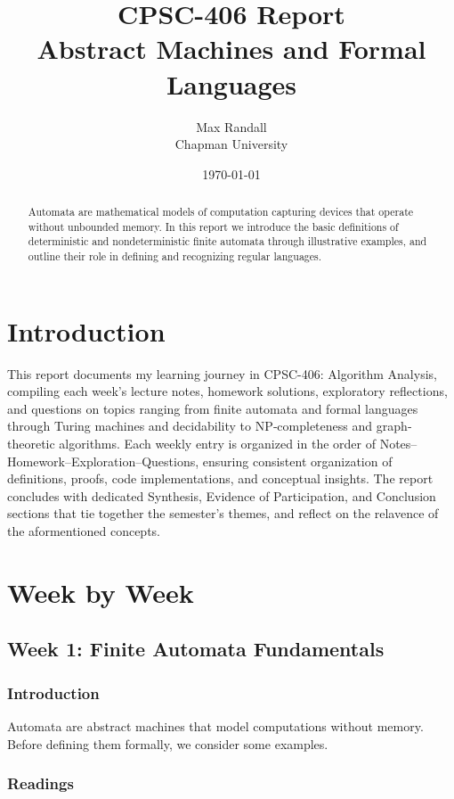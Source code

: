 \documentclass{article}
\title{CPSC-406 Report\\%
       \large Abstract Machines and Formal Languages}
\author{Max Randall \\ Chapman University}
\date{\today}
\theoremstyle{theorem}
\theoremstyle{definition}
\theoremstyle{remark}
\begin{document}
\maketitle

\begin{abstract}
Automata are mathematical models of computation capturing devices
that operate without unbounded memory.  In this report we introduce
the basic definitions of deterministic and nondeterministic finite
automata through illustrative examples, and outline their role in
defining and recognizing regular languages.
\end{abstract}


\tableofcontents

\section{Introduction}\label{intro}
This report documents my learning journey in CPSC-406: Algorithm Analysis, compiling each week’s lecture notes, homework solutions, exploratory reflections, and questions on topics ranging from finite automata and formal languages through Turing machines and decidability to NP‐completeness and graph‐theoretic algorithms. Each weekly entry is organized in the order of Notes–Homework–Exploration–Questions, ensuring consistent organization of definitions, proofs, code implementations, and conceptual insights. The report concludes with dedicated Synthesis, Evidence of Participation, and Conclusion sections that tie together the semester’s themes, and reflect on the relavence of the aformentioned concepts.

\newpage

\section{Week by Week}\label{homework}

\subsection{Week 1: Finite Automata Fundamentals}

\subsubsection{Introduction}
Automata are abstract machines that model computations without memory. Before defining them formally, we consider some examples.

\subsubsection{Readings}
\end{document}
